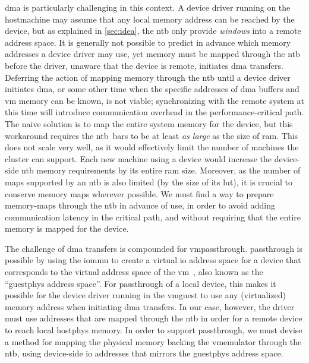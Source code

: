 \Gls{dma} is particularly challenging in this context.
%
A device driver running on the \gls{hostmachine} may assume that any local memory address can be reached by the device, but as explained in \cref{sec:idea}, the \gls{ntb} only provide \emph{windows} into a remote address space.
%
It is generally not possible to predict in advance which memory addresses a device driver may use, yet memory must be mapped through the \gls{ntb} before the driver, unaware that the device is remote, initiates \gls{dma} transfers.
%
Deferring the action of mapping memory through the \gls{ntb} until a device driver initiates \gls{dma}, or some other time when the specific addresses of \gls{dma} buffers and \gls{vm} memory can be known, is not viable;
%
synchronizing with the remote system at this time will introduce communication overhead in the performance-critical path.
%
The naive solution is to map the entire system memory for the device, but this workaround requires the \gls{ntb}~\glspl{bar} to be at least \emph{as large} as the size of \gls{ram}.
%
This does not scale very well, as it would effectively limit the number of machines the cluster can support.
%
Each new machine using a device would increase the device-side \gls{ntb} memory requirements by its entire \gls{ram} size.
%
Moreover, as the number of maps supported by an \gls{ntb} is also limited (by the size of its \gls{lut}), it is crucial to conserve memory maps wherever possible.
%
We must find a way to prepare memory-maps through the \gls{ntb} in advance of use, in order to avoid adding communication latency in the critical path, and without requiring that the entire memory is mapped for the device.



The challenge of \gls{dma} transfers is compounded for \gls{vmpassthrough}.
%
\Gls{passthrough} is possible by using the \gls{iommu} to create a virtual \gls{io} address space for a device that corresponds to the virtual address space of the \gls{vm}~\cite{url:LinuxVFIO,url:LinuxIOMMU,Muli2006}, also known as the ``\gls{guestphys} address space''.
%
For \gls{passthrough} of a local device, this makes it possible for the device driver running in the \gls{vmguest} to use any (virtualized) memory address when initiating \gls{dma} transfers.
%
In our case, however, the driver must use addresses that are mapped through the \gls{ntb} in order for a remote device to reach local \gls{hostphys} memory.
%
In order to support \gls{passthrough}, we must devise a method for mapping the physical memory backing the \gls{vmemulator} through the \gls{ntb}, using device-side \gls{io} addresses that mirrors the \gls{guestphys} address space.



